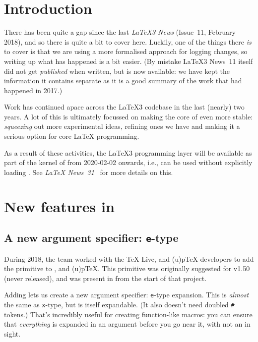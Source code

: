 \documentclass{ltnews}
\begin{document}
\maketitle

\tableofcontents

\section{Introduction}

There has been quite a gap since the last \emph{\LaTeX3 News} (Issue~11,
February 2018), and so there is quite a bit to cover here. Luckily, one of the
things there \emph{is} to cover is that we are using a more formalised approach
for logging changes, so writing up what has happened is a bit easier.
(By mistake \LaTeX3 News~11 itself did not get \emph{published} when written, but is
now available: we have kept the information it contains separate as it
is a good summary of the work that had happened in 2017.)

Work has continued apace across the \LaTeX3 codebase in the last (nearly) two
years. A lot of this is ultimately focussed on making the core of 
even more stable: \emph{squeezing} out more experimental ideas, refining
ones we have and making it a serious option for core \LaTeX{} programming.

As a result of these activities, the \LaTeX3 programming layer will be
available as part of the kernel of \LaTeXe{} from 2020-02-02 onwards, i.e., can
be used without explicitly loading . See \emph{\LaTeX{}
  News~31}~\cite{12:site-news} for more details on this.

\section{New features in }

\subsection{A new argument specifier: \texttt{e}-type}

During 2018, the team worked with the \TeX{} Live,  and
(u)p\TeX{} developers to add the  primitive to ,
 and (u)p\TeX{}. This primitive was originally suggested for
 v1.50 (never released), and was present in 
from the start of that project.

Adding  lets us create a new argument specifier: \texttt{e}-type
expansion. This is \emph{almost} the same as \texttt{x}-type, but is itself
expandable. (It also doesn't need doubled \verb|#| tokens.) That's incredibly
useful for creating function-like macros: you can ensure that \emph{everything}
is expanded in an argument before you go near it, with not an 
in sight.
\end{document}
